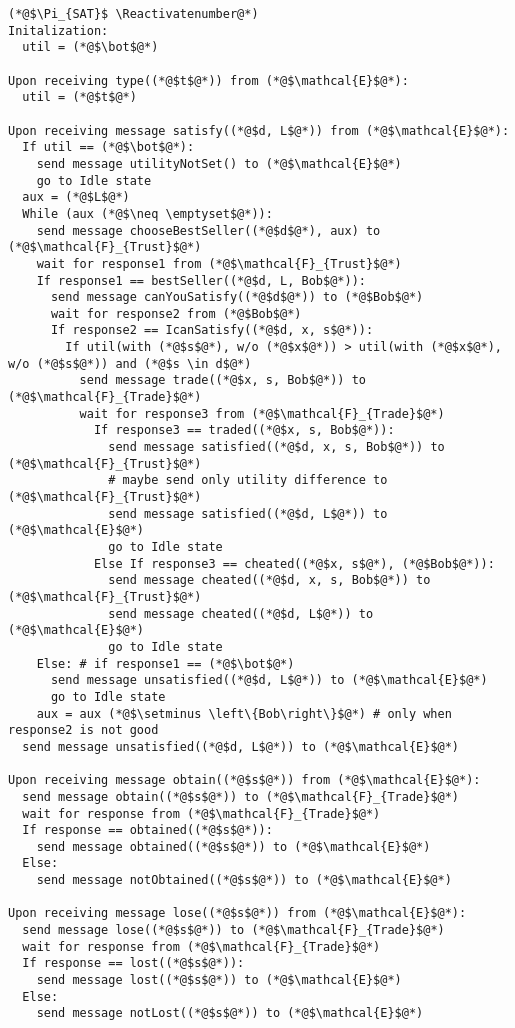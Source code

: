 \Suppressnumber
\begin{lstlisting}[label=satprot, style=numbers]
(*@$\Pi_{SAT}$ \Reactivatenumber@*)
Initalization:
  util = (*@$\bot$@*)

Upon receiving type((*@$t$@*)) from (*@$\mathcal{E}$@*):
  util = (*@$t$@*)

Upon receiving message satisfy((*@$d, L$@*)) from (*@$\mathcal{E}$@*):
  If util == (*@$\bot$@*):
    send message utilityNotSet() to (*@$\mathcal{E}$@*)
    go to Idle state
  aux = (*@$L$@*)
  While (aux (*@$\neq \emptyset$@*)):
    send message chooseBestSeller((*@$d$@*), aux) to (*@$\mathcal{F}_{Trust}$@*)
    wait for response1 from (*@$\mathcal{F}_{Trust}$@*)
    If response1 == bestSeller((*@$d, L, Bob$@*)):
      send message canYouSatisfy((*@$d$@*)) to (*@$Bob$@*)
      wait for response2 from (*@$Bob$@*)
      If response2 == IcanSatisfy((*@$d, x, s$@*)):
        If util(with (*@$s$@*), w/o (*@$x$@*)) > util(with (*@$x$@*), w/o (*@$s$@*)) and (*@$s \in d$@*)
          send message trade((*@$x, s, Bob$@*)) to (*@$\mathcal{F}_{Trade}$@*)
          wait for response3 from (*@$\mathcal{F}_{Trade}$@*)
            If response3 == traded((*@$x, s, Bob$@*)):
              send message satisfied((*@$d, x, s, Bob$@*)) to (*@$\mathcal{F}_{Trust}$@*)
              # maybe send only utility difference to (*@$\mathcal{F}_{Trust}$@*)
              send message satisfied((*@$d, L$@*)) to (*@$\mathcal{E}$@*)
              go to Idle state
            Else If response3 == cheated((*@$x, s$@*), (*@$Bob$@*)):
              send message cheated((*@$d, x, s, Bob$@*)) to (*@$\mathcal{F}_{Trust}$@*)
              send message cheated((*@$d, L$@*)) to (*@$\mathcal{E}$@*)
              go to Idle state
    Else: # if response1 == (*@$\bot$@*)
      send message unsatisfied((*@$d, L$@*)) to (*@$\mathcal{E}$@*)
      go to Idle state
    aux = aux (*@$\setminus \left\{Bob\right\}$@*) # only when response2 is not good
  send message unsatisfied((*@$d, L$@*)) to (*@$\mathcal{E}$@*)

Upon receiving message obtain((*@$s$@*)) from (*@$\mathcal{E}$@*):
  send message obtain((*@$s$@*)) to (*@$\mathcal{F}_{Trade}$@*)
  wait for response from (*@$\mathcal{F}_{Trade}$@*)
  If response == obtained((*@$s$@*)):
    send message obtained((*@$s$@*)) to (*@$\mathcal{E}$@*)
  Else:
    send message notObtained((*@$s$@*)) to (*@$\mathcal{E}$@*)

Upon receiving message lose((*@$s$@*)) from (*@$\mathcal{E}$@*):
  send message lose((*@$s$@*)) to (*@$\mathcal{F}_{Trade}$@*)
  wait for response from (*@$\mathcal{F}_{Trade}$@*)
  If response == lost((*@$s$@*)):
    send message lost((*@$s$@*)) to (*@$\mathcal{E}$@*)
  Else:
    send message notLost((*@$s$@*)) to (*@$\mathcal{E}$@*)


\end{lstlisting}
